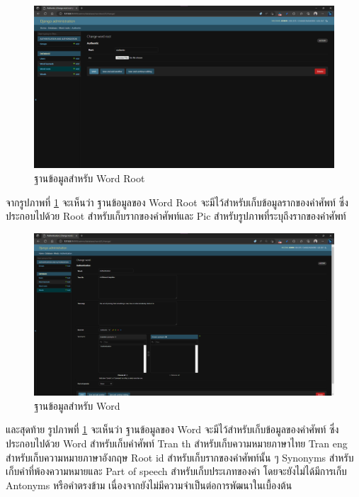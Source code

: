 \documentclass[12pt,oneside,openright,a4paper]{cpe-thai-project}
\begin{document}
\pagebreak
\begin{figure}[!h]\centering
	\includegraphics[width=\textwidth, keepaspectratio=true]{image/chap4/DB/word root.png}
	\caption{{ฐานข้อมูลสำหรับ Word Root}}\label{fig:chap4WordRoot}
\end{figure}
\hspace{1cm}
จากรูปภาพที่ \ref{fig:chap4WordRoot} จะเห็นว่า ฐานข้อมูลของ Word Root จะมีไว้สำหรับเก็บข้อมูลรากของคำศัพท์
ซึ่งประกอบไปด้วย Root สำหรับเก็บรากของคำศัพท์และ Pic สำหรับรูปภาพที่ระบุถึงรากของคำศัพท์

\begin{figure}[!h]\centering
	\includegraphics[width=\textwidth, keepaspectratio=true]{image/chap4/DB/word.png}
	\caption{{ฐานข้อมูลสำหรับ Word}}\label{fig:chap4Word}
\end{figure}
\hspace{1cm}
และสุดท้าย รูปภาพที่ \ref{fig:chap4WordRoot} จะเห็นว่า ฐานข้อมูลของ Word จะมีไว้สำหรับเก็บข้อมูลของคำศัพท์
ซึ่งประกอบไปด้วย Word สำหรับเก็บคำศัพท์ Tran th สำหรับเก็บความหมายภาษาไทย Tran eng สำหรับเก็บความหมายภาษาอังกฤษ
Root id สำหรับเก็บรากของคำศัพท์นั้น ๆ  Synonyms สำหรับเก็บคำที่พ้องความหมายและ Part of speech สำหรับเก็บประเภทของคํา
โดยจะยังไม่ได้มีการเก็บ Antonyms หรือคำตรงข้าม เนื่องจากยังไม่มีความจำเป็นต่อการพัฒนาในเบื้องต้น
\end{document}
